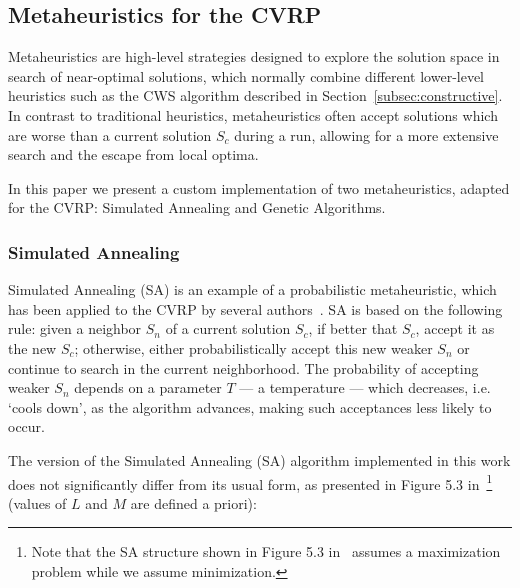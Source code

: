 \subsection{Metaheuristics for the CVRP}
\label{subsec:metaheuristics}

Metaheuristics are high-level strategies designed to explore the solution space 
in search of near-optimal solutions, which normally combine different 
lower-level heuristics such as the CWS algorithm described in 
Section~\ref{subsec:constructive}. In contrast to traditional heuristics, 
metaheuristics often accept solutions which are worse than a current solution 
$S_c$ during a run, allowing for a more extensive search and the escape from 
local optima.\vertbreak

In this paper we present a custom implementation of two metaheuristics, adapted 
for the CVRP: Simulated Annealing and Genetic Algorithms.\vertbreak

\subsubsection{Simulated Annealing}
\label{subsubsec:sim-anneal}

Simulated Annealing (SA) is an example of a probabilistic metaheuristic, which 
has been applied to the CVRP by several authors~\cite{Toth2002}. SA is based on 
the following rule: given a neighbor $S_n$ of a current solution $S_c$, if 
better that $S_c$, accept it as the new $S_c$; otherwise, either 
probabilistically accept this new weaker $S_n$ or continue to search in 
the current neighborhood. The probability of accepting weaker $S_n$ depends 
on a parameter $T$ --- a temperature --- which decreases, i.e. `cools down', as 
the algorithm advances, making such acceptances less likely to occur.\vertbreak

The version of the Simulated Annealing (SA) algorithm implemented in this work 
does not significantly differ from its usual form, as presented in Figure 5.3 
in~\cite{Michalewicz2004}\footnote{Note that the SA structure shown in Figure 
5.3 in~\cite{Michalewicz2004} assumes a maximization problem while we assume 
minimization.} (values of $L$ and $M$ are defined a priori):\vertbreak

